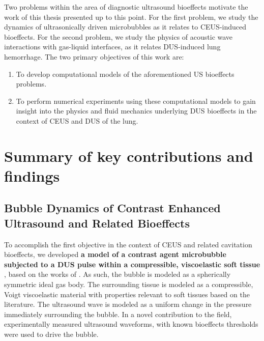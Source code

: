 Two problems within the area of diagnostic ultrasound bioeffects
motivate the work of this thesis presented up to this point. For the
first problem, we study the dynamics of ultrasonically driven
microbubbles as it relates to \ac{CEUS}-induced bioeffects. For the
second problem, we study the physics of acoustic wave interactions with
gas-liquid interfaces, as it relates \ac{DUS}-induced lung hemorrhage.
The two primary objectives of this work are:
\begin{enumerate}
\item To develop computational models of the aforementioned \ac{US}
  bioeffects problems.
\item To perform numerical experiments using these computational
  models to gain insight into the physics and fluid mechanics
  underlying \ac{DUS} bioeffects in the context of \ac{CEUS} and
  \ac{DUS} of the lung.
\end{enumerate}
\section{Summary of key contributions and findings}
\subsection{Bubble Dynamics of Contrast Enhanced Ultrasound and Related Bioeffects}
To accomplish the first objective in the context of \ac{CEUS} and
related cavitation bioeffects, we developed \textbf{a model of a
  contrast agent microbubble subjected to a \ac{DUS} pulse within a
  compressible, viscoelastic soft tissue \citep{Patterson2012}}, based
on the works of \cite{Keller1980,Yang2005}. As such, the bubble is
modeled as a spherically symmetric ideal gas body. The surrounding
tissue is modeled as a compressible, Voigt viscoelastic material with
properties relevant to soft tissues based on the literature. The
ultrasound wave is modeled as a uniform change in the pressure
immediately surrounding the bubble. In a novel contribution to the
field, experimentally measured ultrasound waveforms, with known
bioeffects thresholds \citep{Miller2008b} were used to drive the
bubble.

